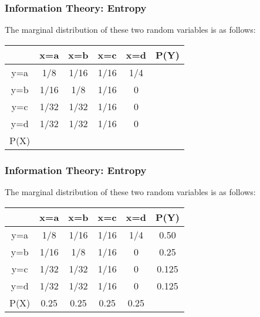 ﻿\documentclass[a4]{beamer}
\begin{document}
\begin{frame}
\frametitle{Information Theory: Entropy}
\Large
The marginal distribution of these two random variables is as follows:\\ \bigskip
\begin{center}
\begin{tabular}{|c||c|c|c|c||c|}
\hline
&x=a& x=b & x=c & x=d & P(Y)\\ \hline\hline
y=a &1/8 &1/16 &1/16 &1/4 & \\ \hline
y=b &1/16 & 1/8& 1/16& 0 &\\ \hline
y=c & 1/32&1/32 & 1/16 & 0& \\ \hline
y=d & 1/32& 1/32& 1/16 & 0& \\ \hline \hline
P(X) & &&  & &\\ \hline
\end{tabular}
\end{center}
\end{frame}
\begin{frame}
\frametitle{Information Theory: Entropy}
\Large
The marginal distribution of these two random variables is as follows:\\ \bigskip
\begin{center}
\begin{tabular}{|c||c|c|c|c||c|}
\hline
&x=a& x=b & x=c & x=d &\alert{P(Y)}\\ \hline\hline
y=a &1/8 &1/16 &1/16 &1/4 & \alert{0.50}\\ \hline
y=b &1/16 & 1/8& 1/16& 0 & \alert{0.25}\\ \hline
y=c & 1/32&1/32 & 1/16 & 0& \alert{0.125}\\ \hline
y=d & 1/32& 1/32& 1/16 & 0& \alert{0.125}\\ \hline \hline
\alert{P(X)} & \alert{0.25}& \alert{0.25}& \alert{0.25} & \alert{0.25}&\\ \hline
\end{tabular}
\end{center}
\end{frame}
\end{document}
